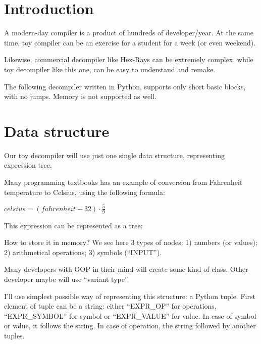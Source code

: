 ﻿\documentclass[12pt]{article}
\author{\AUTHOR}
\title{\TITLE}
\date{April 2016 -- December 2016}
\begin{document}
\maketitle

\tableofcontents

\section{Introduction}

A modern-day compiler is a product of hundreds of developer/year.
At the same time, toy compiler can be an exercise for a student for a week (or even weekend).

Likewise, commercial decompiler like Hex-Rays can be extremely complex,
while toy decompiler like this one, can be easy to understand and remake.

The following decompiler written in Python, supports only short basic blocks, with no jumps.
Memory is not supported as well.

\section{Data structure}

Our toy decompiler will use just one single data structure, representing expression tree.

Many programming textbooks has an example of conversion from Fahrenheit temperature to Celsius, using the following formula:

\begin{center}
{\large $celsius = (fahrenheit - 32) \cdot \frac{5}{9}$}
\end{center}

This expression can be represented as a tree:



How to store it in memory?
We see here 3 types of nodes: 1) numbers (or values); 2) arithmetical operations; 3) symbols (``INPUT'').

Many developers with \ac{OOP} in their mind will create some kind of class.
Other developer maybe will use ``variant type''.

I'll use simplest possible way of representing this structure: a Python tuple.
First element of tuple can be a string:
either ``EXPR\_OP'' for operations, ``EXPR\_SYMBOL'' for symbol or ``EXPR\_VALUE'' for value.
In case of symbol or value, it follows the string.
In case of operation, the string followed by another tuples.
\end{document}
